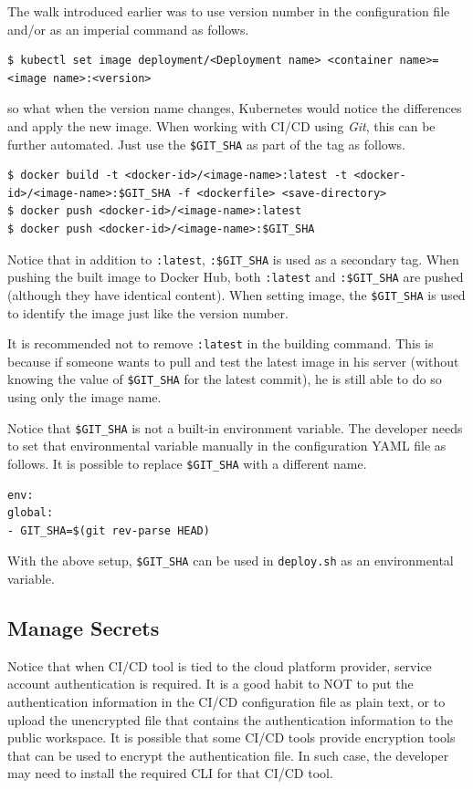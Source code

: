 The walk introduced earlier was to use version number in the configuration file and/or as an imperial command as follows.
\begin{lstlisting}
$ kubectl set image deployment/<Deployment name> <container name>=<image name>:<version>
\end{lstlisting}
so what when the version name changes, Kubernetes would notice the differences and apply the new image. When working with CI/CD using \textit{Git}, this can be further automated. Just use the \verb|$GIT_SHA| as part of the tag as follows.
\begin{lstlisting}
$ docker build -t <docker-id>/<image-name>:latest -t <docker-id>/<image-name>:$GIT_SHA -f <dockerfile> <save-directory>
$ docker push <docker-id>/<image-name>:latest
$ docker push <docker-id>/<image-name>:$GIT_SHA
\end{lstlisting}
Notice that in addition to \verb|:latest|, \verb|:$GIT_SHA| is used as a secondary tag. When pushing the built image to Docker Hub, both \verb|:latest| and \verb|:$GIT_SHA| are pushed (although they have identical content). When setting image, the \verb|$GIT_SHA| is used to identify the image just like the version number.

It is recommended not to remove \verb|:latest| in the building command. This is because if someone wants to pull and test the latest image in his server (without knowing the value of \verb|$GIT_SHA| for the latest commit), he is still able to do so using only the image name.

Notice that \verb|$GIT_SHA| is not a built-in environment variable. The developer needs to set that environmental variable manually in the configuration YAML file as follows. It is possible to replace \verb|$GIT_SHA| with a different name.
\begin{lstlisting}
env:
global:
- GIT_SHA=$(git rev-parse HEAD)
\end{lstlisting}
With the above setup, \verb|$GIT_SHA| can be used in \verb|deploy.sh| as an environmental variable.

\subsection{Manage Secrets}

Notice that when CI/CD tool is tied to the cloud platform provider, service account authentication is required. It is a good habit to NOT to put the authentication information in the CI/CD configuration file as plain text, or to upload the unencrypted file that contains the authentication information to the public workspace. It is possible that some CI/CD tools provide encryption tools that can be used to encrypt the authentication file. In such case, the developer may need to install the required CLI for that CI/CD tool.

